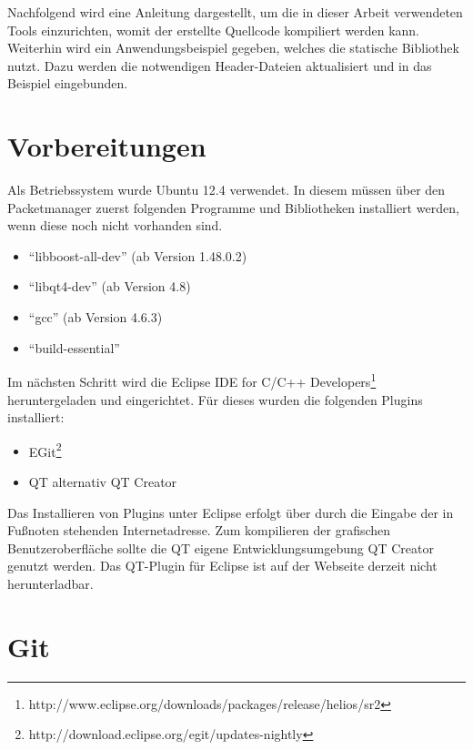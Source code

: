 Nachfolgend wird eine Anleitung dargestellt, um die in
dieser Arbeit verwendeten Tools einzurichten, womit der erstellte
Quellcode kompiliert werden kann. Weiterhin wird ein Anwendungsbeispiel
gegeben, welches die statische Bibliothek nutzt. Dazu werden die notwendigen
Header-Dateien aktualisiert und in das Beispiel eingebunden.

\section{Vorbereitungen}

Als Betriebssystem wurde Ubuntu 12.4 verwendet. In diesem müssen
über den Packetmanager zuerst folgenden Programme und Bibliotheken installiert
werden, wenn diese noch nicht vorhanden sind.

\begin{itemize}
\item "`libboost-all-dev"' (ab Version 1.48.0.2) 
\item "`libqt4-dev"' (ab Version 4.8)
\item "`gcc"' (ab Version 4.6.3)
\item "`build-essential"'
\end{itemize}

Im nächsten Schritt wird die Eclipse IDE for C/C++
Developers\footnote{http://www.eclipse.org/downloads/packages/release/helios/sr2}
heruntergeladen und eingerichtet. Für dieses wurden die folgenden Plugins installiert:

\begin{itemize}
\item EGit\footnote{http://download.eclipse.org/egit/updates-nightly}
\item QT
alternativ QT Creator
\end{itemize}

Das Installieren von Plugins unter Eclipse erfolgt über  durch die Eingabe der in Fußnoten stehenden
Internetadresse. Zum kompilieren der grafischen Benutzeroberfläche sollte die
QT eigene Entwicklungsumgebung QT Creator  genutzt werden.
Das QT-Plugin für Eclipse ist auf der Webseite derzeit nicht herunterladbar.

\section{Git}

